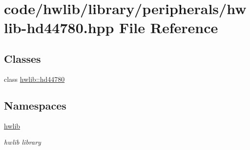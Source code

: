 \hypertarget{hwlib-hd44780_8hpp}{}\section{code/hwlib/library/peripherals/hwlib-\/hd44780.hpp File Reference}
\label{hwlib-hd44780_8hpp}
\subsection*{Classes}
\begin{DoxyCompactItemize}
\item 
class \hyperlink{classhwlib_1_1hd44780}{hwlib\+::hd44780}
\end{DoxyCompactItemize}
\subsection*{Namespaces}
\begin{DoxyCompactItemize}
\item 
 \hyperlink{namespacehwlib}{hwlib}
\begin{DoxyCompactList}\small\item\em hwlib library \end{DoxyCompactList}\end{DoxyCompactItemize}
